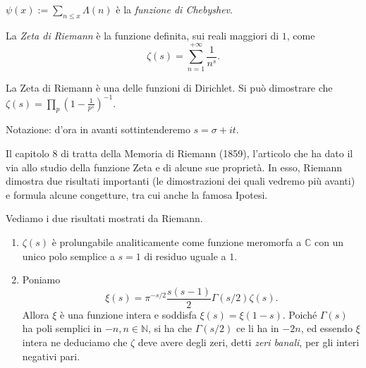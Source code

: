 \begin{defn}
  $\displaystyle\psi(x):=\sum_{n \le x} \Lambda(n)$ è la \textit{funzione di Chebyshev}.
\end{defn}

\begin{defn}
  La \textit{Zeta di Riemann} è la funzione definita, sui reali maggiori di $1$, come
  \begin{equation} \label{Zeta}
    \zeta(s)=\sum_{n=1}^{+\infty} \frac{1}{n^s}.
  \end{equation}
\end{defn}

La Zeta di Riemann è una delle funzioni di Dirichlet. Si può dimostrare che $\displaystyle \zeta(s)=\prod_p \left(1-\frac{1}{p^s}\right)^{-1}$.

Notazione: d'ora in avanti sottintenderemo $s=\sigma+it$.

Il capitolo 8 di \cite{D} tratta della Memoria di Riemann (1859), l'articolo che ha dato il via allo studio della funzione Zeta e di alcune sue proprietà. In esso, Riemann dimostra due risultati importanti (le dimostrazioni dei quali vedremo più avanti) e formula alcune congetture, tra cui anche la famosa Ipotesi.

Vediamo i due risultati mostrati da Riemann.
\begin{enumerate}
  \item $\zeta(s)$ è prolungabile analiticamente come funzione meromorfa a $\mathbb{C}$ con un unico polo semplice a $s=1$ di residuo uguale a $1$.
  \item Poniamo
  \begin{equation} \label{xi}
    \xi(s)=\pi^{-s/2}\frac{s(s-1)}{2}\Gamma(s/2)\zeta(s).
  \end{equation}
  Allora $\xi$ è una funzione intera e soddisfa $\xi(s)=\xi(1-s)$. Poiché $\Gamma(s)$ ha poli semplici in $-n, n \in \mathbb{N}$, si ha che $\Gamma(s/2)$ ce li ha in $-2n$, ed essendo $\xi$ intera ne deduciamo che $\zeta$ deve avere degli zeri, detti \textit{zeri banali}, per gli interi negativi pari.
\end{enumerate}

